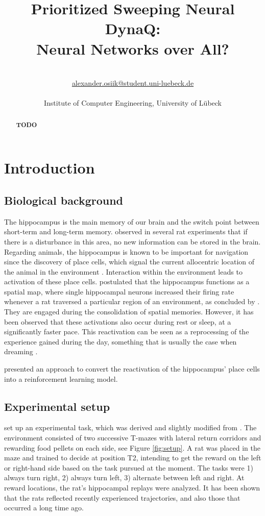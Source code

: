 \documentclass[a4paper]{article}
\title{\textbf{Prioritized Sweeping Neural DynaQ:\\ Neural Networks over All?}}\let\Title\@title
\author{\AuthorName\\
	\href{mailto:alexander.osiik@student.uni-luebeck.de}{alexander.osiik@student.uni-luebeck.de}\\
	\small \seminar\\
	\small Institute of Computer Engineering, University of L\"ubeck\\
}\let\Author\@author
\begin{document}
	\maketitle
	
	\begin{abstract}
		\noindent%
		\textbf{TODO}
	\end{abstract}
	
	
	\section{Introduction}
	\subsection{Biological background}
	\label{sec:introduction}
	\par The hippocampus is the main memory of our brain and the switch point between short-term and long-term memory. \citet{OKEEFE1971171} observed in several rat experiments that if there is a disturbance in this area, no new information can be stored in the brain. Regarding animals, the hippocampus is known to be important for navigation since the discovery of place cells, which signal the current allocentric location of the animal in the environment \citep{Maguire}. Interaction within the environment leads to activation of these place cells. \cite{OKEEFE1971171} postulated that the hippocampus functions as a spatial map, where single hippocampal neurons increased their firing rate whenever a rat traversed a particular region of an environment, as concluded by \cite{Nakazawa}. They are engaged during the consolidation of spatial memories. However, it has been observed that these activations also occur during rest or sleep, at a significantly faster pace. This reactivation can be seen as a reprocessing of the experience gained during the day, something that is usually the case when dreaming \citep{HippocampalReplaysGirard}.
	
	\par \citet{NeuralDynaQ} presented an approach to convert the reactivation of the hippocampus' place cells into a reinforcement learning model.  
	
	\subsection{Experimental setup}
	\par \cite{NeuralDynaQ} set up an experimental task, which was derived and slightly modified from \cite{GUPTA2010695}. The environment consisted of two successive T-mazes with lateral return corridors and rewarding food pellets on each side, see Figure \ref{fig:setup}. A rat was placed in the maze and trained to decide at position T2, intending to get the reward on the left or right-hand side based on the task pursued at the moment. The tasks were 1) always turn right, 2) always turn left, 3) alternate between left and right. At reward locations, the rat's hippocampal replays were analyzed. It has been shown that the rats reflected recently experienced trajectories, and also those that occurred a long time ago.
	
\end{document}
